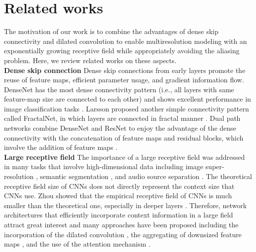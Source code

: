 \documentclass[final]{cvpr}
\begin{document}
\section{Related works}
The motivation of our work is to combine the advantages of dense skip connectivity and dilated convolution to enable multiresolution modeling with an exponentially growing receptive field while appropriately avoiding the aliasing problem. Here, we review related works on these aspects. 
\vspace{3mm}\\
\textbf{Dense skip connection} \hspace{1mm}
Dense skip connections from early layers promote the reuse of feature maps, efficient parameter usage, and gradient information flow. DenseNet has the most dense connectivity pattern (i.e., all layers with same feature-map size are connected to each other) and shows excellent performance in image classification tasks \cite{Huang17Densenet}. Larsson \etal proposed another simple connectivity pattern called FractalNet, in which layers are connected in fractal manner \cite{Larsson17}. Dual path networks combine DenseNet and ResNet to enjoy the advantage of the dense connectivity with the concatenation of feature maps and residual blocks, which involve the addition of feature maps \cite{Chen2017DualPN}. 
\vspace{3mm}\\
\textbf{Large receptive field} \hspace{1mm}
The importance of a large receptive field was addressed in many tasks that involve high-dimensional data including image super-resolution \cite{Seif18LRF}, semantic segmentation \cite{Chen17Deeplab,zhao2017pspnet,zhao2018psanet,Chen2015,Yu16dilation}, and audio source separation \cite{Takahashi18MMDenseLSTM}. The theoretical receptive field size of CNNs does not directly represent the context size that CNNs use. Zhou \etal showed that the empirical receptive field of CNNs is much smaller than the theoretical one, especially in deeper layers \cite{Zhou2015}. 
Therefore, network architectures that efficiently incorporate context information in a large field attract great interest and many approaches have been proposed including the incorporation of the dilated convolution \cite{Yu16dilation,Chen2017DeepLab}, the aggregating of downsized feature maps \cite{zhao2017pspnet}, and the use of the attention mechanism \cite{zhao2018psanet,fu2018dual,Zhong20SAN,zhang2020resnest}.
\vspace{3mm}\\
\end{document}
